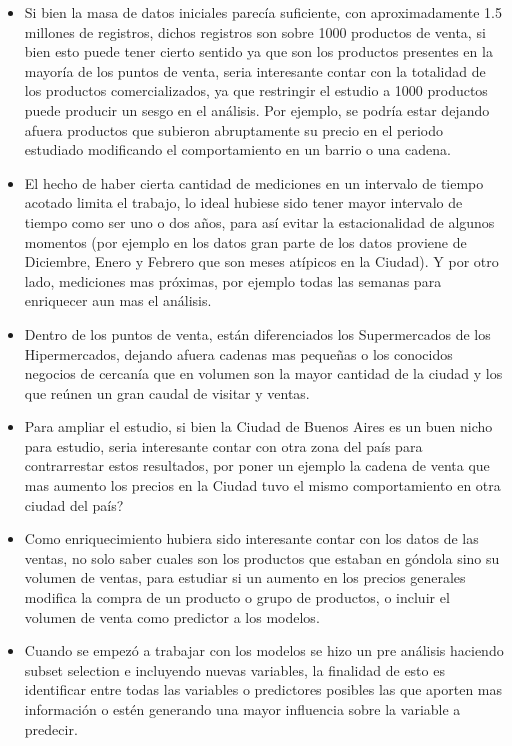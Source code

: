 \begin{itemize}
  \item Si bien la masa de datos iniciales parecía suficiente, con aproximadamente 1.5 millones de registros, dichos registros son sobre 1000 productos de venta, si bien esto puede tener cierto sentido ya que son los productos presentes en la mayoría de los puntos de venta, seria interesante contar con la totalidad de los productos comercializados, ya que restringir el estudio a 1000 productos puede producir un sesgo en el análisis. Por ejemplo, se podría estar dejando afuera productos que subieron abruptamente su precio en el periodo estudiado modificando el comportamiento en un barrio o una cadena.
  \item El hecho de haber cierta cantidad de mediciones en un intervalo de tiempo acotado limita el trabajo, lo ideal hubiese sido tener mayor intervalo de tiempo como ser uno o dos años, para así evitar la estacionalidad de algunos momentos (por ejemplo en los datos gran parte de los datos proviene de Diciembre, Enero y Febrero que son meses atípicos en la Ciudad). Y por otro lado, mediciones mas próximas, por ejemplo todas las semanas para enriquecer aun mas el análisis.
  \item Dentro de los puntos de venta, están diferenciados los Supermercados de los Hipermercados, dejando afuera cadenas mas pequeñas o los conocidos negocios de cercanía que en volumen son la mayor cantidad de la ciudad y los que reúnen un gran caudal de visitar y ventas.
  \item Para ampliar el estudio, si bien la Ciudad de Buenos Aires es un buen nicho para estudio, seria interesante contar con otra zona del país para contrarrestar estos resultados, por poner un ejemplo la cadena de venta que mas aumento los precios en la Ciudad tuvo el mismo comportamiento en otra ciudad del país?
  \item Como enriquecimiento hubiera sido interesante contar con los datos de las ventas, no solo saber cuales son los productos que estaban en góndola sino su volumen de ventas, para estudiar si un aumento en los precios generales modifica la compra de un producto o grupo de productos, o incluir el volumen de venta como predictor a los modelos.
  \item Cuando se empezó a trabajar con los modelos se hizo un pre análisis haciendo subset selection e incluyendo nuevas variables, la finalidad de esto es identificar entre todas las variables o predictores posibles las que aporten mas información o estén generando una mayor influencia sobre la variable a predecir.\\

\end{itemize}
